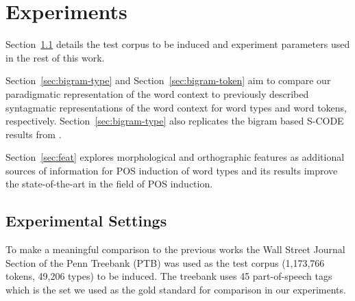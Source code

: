 \section{Experiments}
\label{sec:exp}

Section~\ref{sec:expset} details the test corpus to be induced and
experiment parameters used in the rest of this work.


Section~\ref{sec:bigram-type} and Section~\ref{sec:bigram-token} aim
to compare our paradigmatic representation of the word context to
previously described syntagmatic representations of the word context
for word types and word tokens, respectively.
Section~\ref{sec:bigram-type} also replicates the bigram based S-CODE
results from \cite{maron2010sphere}.

Section~\ref{sec:feat} explores morphological and orthographic
features as additional sources of information for POS induction of
word types and its results improve the state-of-the-art in the field
of POS induction.

\subsection{Experimental Settings}\label{sec:expset}

To make a meaningful comparison to the previous works
the Wall Street Journal Section of the Penn Treebank (PTB) \cite{treebank3}
was used as the test corpus (1,173,766 tokens, 49,206 types) to be
induced.
The treebank uses 45 part-of-speech tags which is the set we used as
the gold standard for comparison in our experiments.

